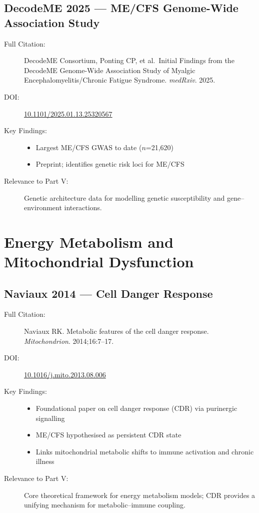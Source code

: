 \subsection{DecodeME 2025 --- ME/CFS Genome-Wide Association Study}

\begin{description}
    \item[Full Citation:] DecodeME Consortium, Ponting CP, et al.\ Initial Findings from the DecodeME Genome-Wide Association Study of Myalgic Encephalomyelitis/Chronic Fatigue Syndrome. \textit{medRxiv}. 2025. \cite{DecodeME2025}
    \item[DOI:] \href{https://doi.org/10.1101/2025.01.13.25320567}{10.1101/2025.01.13.25320567}
    \item[Key Findings:]
    \begin{itemize}
        \item Largest ME/CFS GWAS to date ($n$=21,620)
        \item Preprint; identifies genetic risk loci for ME/CFS
    \end{itemize}
    \item[Relevance to Part V:] Genetic architecture data for modelling genetic susceptibility and gene--environment interactions.
\end{description}

\section{Energy Metabolism and Mitochondrial Dysfunction}
\label{sec:bib-energy-metabolism-additions}

\subsection{Naviaux 2014 --- Cell Danger Response}

\begin{description}
    \item[Full Citation:] Naviaux RK. Metabolic features of the cell danger response. \textit{Mitochondrion}. 2014;16:7--17. \cite{Naviaux2014cdr}
    \item[DOI:] \href{https://doi.org/10.1016/j.mito.2013.08.006}{10.1016/j.mito.2013.08.006}
    \item[Key Findings:]
    \begin{itemize}
        \item Foundational paper on cell danger response (CDR) via purinergic signalling
        \item ME/CFS hypothesised as persistent CDR state
        \item Links mitochondrial metabolic shifts to immune activation and chronic illness
    \end{itemize}
    \item[Relevance to Part V:] Core theoretical framework for energy metabolism models; CDR provides a unifying mechanism for metabolic--immune coupling.
\end{description}

